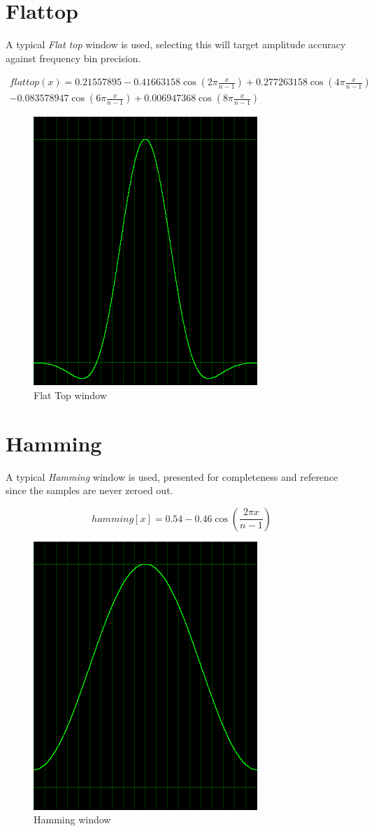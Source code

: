 \documentclass[10pt,a4paper]{report}
\begin{document}
\begin{appendices}
\newpage
\section{Flattop}
A typical \textit{Flat top} window is used, selecting this will target amplitude accuracy against frequency bin precision.

\begin{align*}
flattop(x)=0.21557895 - 0.41663158\cos(2\pi\frac{x}{n-1})+ 0.277263158\cos(4\pi\frac{x}{n-1})\\
- 0.083578947\cos(6\pi\frac{x}{n-1}) + 0.006947368\cos(8\pi\frac{x}{n-1})
\end{align*}

\begin{figure}[H]
	\centering
	\includegraphics[width=0.4\linewidth]{plots/window-flattop.png}
	\caption[Flat Top window]{Flat Top window}
	\label{fig:window-flattop}
\end{figure}

\newpage
\section{Hamming}
A typical \textit{Hamming} window is used, presented for completeness and reference since the samples are never zeroed out.

\begin{equation}
hamming[x] = 0.54 - 0.46\cos(\frac{2\pi x}{n-1})
\end{equation}

\begin{figure}[H]
	\centering
	\includegraphics[width=0.4\linewidth]{plots/window-hamming.png}
	\caption[Hamming window]{Hamming window}
	\label{fig:window-hamming}
\end{figure}



\end{appendices}
\end{document}
